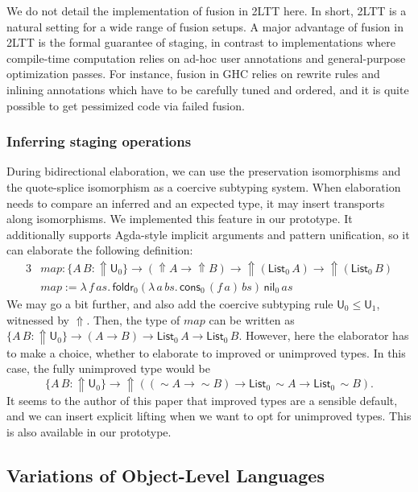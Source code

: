\documentclass[acmsmall]{acmart}
\newcommand{\mit}[1]{\mathit{#1}}
\newcommand{\msf}[1]{\mathsf{#1}}
\newcommand{\Lift}{{\Uparrow}}
\newcommand{\spl}{{\sim}}
\renewcommand{\U}{\msf{U}}
\newcommand{\List}{\msf{List}}
\newcommand{\nil}{\msf{nil}}
\newcommand{\cons}{\msf{cons}}
\theoremstyle{remark}
\begin{document}
We do not detail the implementation of fusion in 2LTT here. In short, 2LTT is a
natural setting for a wide range of fusion setups. A major advantage of fusion
in 2LTT is the formal guarantee of staging, in contrast to implementations where
compile-time computation relies on ad-hoc user annotations and general-purpose
optimization passes. For instance, fusion in GHC relies on rewrite rules and
inlining annotations which have to be carefully tuned and ordered, and it is
quite possible to get pessimized code via failed fusion.

\subsubsection{Inferring staging operations}
During bidirectional elaboration, we can use the preservation isomorphisms and
the quote-splice isomorphism as a coercive subtyping system. When elaboration
needs to compare an inferred and an expected type, it may insert transports
along isomorphisms. We implemented this feature in our prototype. It
additionally supports Agda-style implicit arguments and pattern unification, so
it can elaborate the following definition:
\begin{alignat*}{3}
  & \mit{map} : \{A\,B : \Lift\U_0\} \to (\Lift A \to \Lift B)
      \to \Lift(\List_0\,A) \to \Lift(\List_0\,B)\\
  & \mit{map} := \lambda\,f\,\mit{as}.\,
      \msf{foldr}_0
        (\lambda\,a\,\mit{bs}.\, \cons_0\,(f\,a)\,\mit{bs})\,
        \nil_0\,
        as
\end{alignat*}
We may go a bit further, and also add the coercive subtyping rule $\U_0 \leq
\U_1$, witnessed by $\Lift$. Then, the type of $\mit{map}$ can be written as
$\{A\,B : \Lift\U_0\} \to (A \to B) \to \List_0\,A \to \List_0\,B$. However,
here the elaborator has to make a choice, whether to elaborate to improved or
unimproved types. In this case, the fully unimproved type would be
\[ \{A\,B : \Lift\U_0\} \to \Lift((\spl A \to \spl B) \to \List_0\,\spl A \to \List_0\,\spl B). \]
It seems to the author of this paper that improved types are a sensible default,
and we can insert explicit lifting when we want to opt for unimproved
types. This is also available in our prototype.

\subsection{Variations of Object-Level Languages}
\label{sec:variations}
\end{document}
